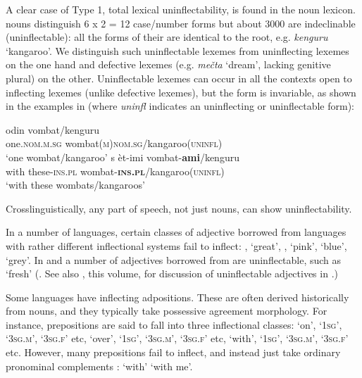 \documentclass[output=paper,colorlinks,citecolor=brown]{langscibook}
\begin{document}
A clear case of Type 1, total lexical uninflectability, is found in the  noun lexicon.  nouns distinguish 6 x 2 = 12 case/number forms but about 3000 are indeclinable (uninflectable): all the forms of their  are identical to the root, e.g. \textit{kenguru} `kangaroo’. We distinguish such {uninflectable} lexemes from uninflecting lexemes on the one hand and defective lexemes (e.g.  \textit{me\v{c}ta} `dream’, lacking genitive plural) on the other. Uninflectable lexemes can occur in all the contexts open to inflecting lexemes (unlike defective lexemes), but the form is invariable, as shown in the  examples in   (where \textit{uninfl} indicates an uninflecting or uninflectable form):


\ea\label{kenguru}
\begin{xlist}
\ex\label{wombat}
\gll	odin 				vombat/kenguru\\
one.\textsc{nom.m.sg} wombat(\textsc{m})\textsc{nom.sg}/kangaroo(\textsc{uninfl})\\
\glt	‘one wombat/kangaroo’ 								
\ex\label{wombats}
\gll	s 	èt-imi 			vombat-\textbf{ami}/kenguru\\
with 	these-\textsc{ins.pl} 	wombat-\textsc{\textbf{ins.pl}}/kangaroo(\textsc{uninfl})\\
\glt	`with these wombats/kangaroos’
\end{xlist}									
\z

\noindent%
Crosslinguistically, any part of speech, not just nouns, can show uninflectability. 

In a number of languages, certain classes of adjective  borrowed from languages with rather different inflectional systems  fail to inflect:  , `great', , `pink',   `blue',  `grey'. In  and  a number of adjectives borrowed from  are uninflectable, such as   ‘fresh’  (\citealp{friedman1993}. See also \citeauthor{thorntondachille2025}, this volume, for discussion of uninflectable adjectives in .) 

Some languages have inflecting adpositions. These are  often derived historically from nouns, and they typically  take possessive agreement morphology. For instance,   prepositions are said to fall into three inflectional classes: %
 `on',      `\textsc{1sg}',  `\textsc{3sg.m}',  `\textsc{3sg.f}' etc, %
 `over',   `\textsc{1sg}',  \textsc{`3sg.m'},  `\textsc{3sg.f}' etc, %
 `with',      \textsc{`1sg'},  \textsc{`3sg.m'},  \textsc{`3sg.f'} etc.  %
However, many prepositions fail to inflect, and instead just take ordinary pronominal complements \citep[47, 127]{williams1980}:  `with'   `with me'. 
\end{document}
